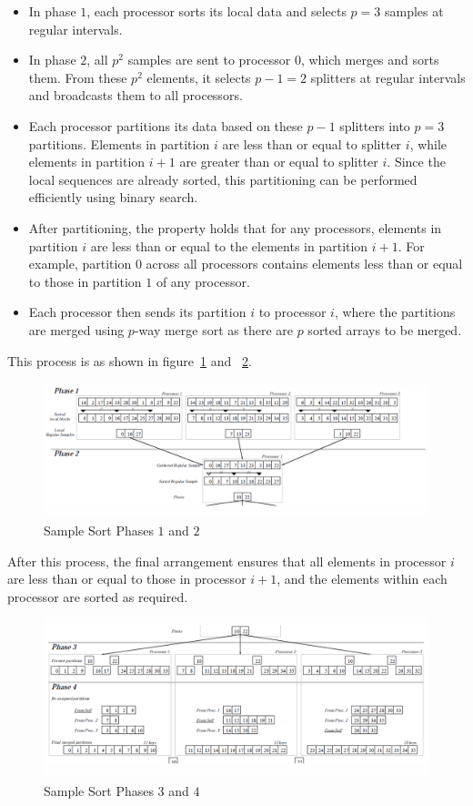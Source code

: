 \documentclass[12pt]{book}
\begin{document}
\begin{itemize}
    \item In phase $1$, each processor sorts its local data and selects $p=3$ samples at regular intervals.
    \item In phase $2$, all $p^2$ samples are sent to processor $0$, which merges and sorts them. From these $p^2$ elements, it selects $p-1=2$ splitters at regular intervals and broadcasts them to all processors.
    \item Each processor partitions its data based on these $p-1$ splitters into $p=3$ partitions. Elements in partition $i$ are less than or equal to splitter $i$, while elements in partition $i+1$ are greater than or equal to splitter $i$. Since the local sequences are already sorted, this partitioning can be performed efficiently using binary search.
    \item After partitioning, the property holds that for any processors, elements in partition $i$ are less than or equal to the elements in partition $i+1$. For example, partition $0$ across all processors contains elements less than or equal to those in partition $1$ of any processor.
    \item Each processor then sends its partition $i$ to processor $i$, where the partitions are merged using $p$-way merge sort as there are $p$ sorted arrays to be merged.
\end{itemize}
This process is as shown in figure~\ref{fig:sample_sort1} and ~\ref{fig:sample_sort2}.
\begin{figure}[ht]
    \centering
    \includegraphics[width=\linewidth]{images/Sample_sort1.png}
    \caption{Sample Sort Phases $1$ and $2$}
    \label{fig:sample_sort1}
\end{figure}
After this process, the final arrangement ensures that all elements in processor $i$ are less than or equal to those in processor $i+1$, and the elements within each processor are sorted as required.
\begin{figure}[ht]
    \centering
    \includegraphics[width=\linewidth]{images/Sample_sort2.png}
    \caption{Sample Sort Phases $3$ and $4$}
    \label{fig:sample_sort2}
\end{figure}
\end{document}
